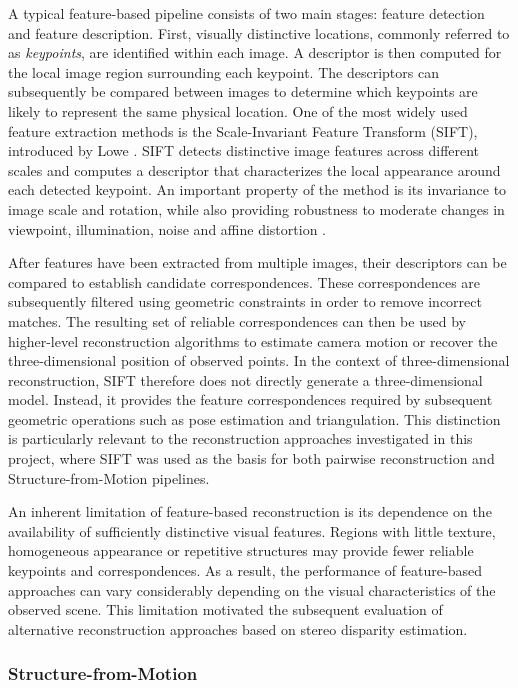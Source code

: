 A typical feature-based pipeline consists of two main stages: feature detection and feature description. First, visually distinctive locations, commonly referred to as \textit{keypoints}, are identified within each image. A descriptor is then computed for the local image region surrounding each keypoint. The descriptors can subsequently be compared between images to determine which keypoints are likely to represent the same physical location. One of the most widely used feature extraction methods is the Scale-Invariant Feature Transform (SIFT), introduced by Lowe \cite{lowe_distinctive_2004}. SIFT detects distinctive image features across different scales and computes a descriptor that characterizes the local appearance around each detected keypoint. An important property of the method is its invariance to image scale and rotation, while also providing robustness to moderate changes in viewpoint, illumination, noise and affine distortion \cite{lowe_distinctive_2004}.

After features have been extracted from multiple images, their descriptors can be compared to establish candidate correspondences. These correspondences are subsequently filtered using geometric constraints in order to remove incorrect matches. The resulting set of reliable correspondences can then be used by higher-level reconstruction algorithms to estimate camera motion or recover the three-dimensional position of observed points. In the context of three-dimensional reconstruction, SIFT therefore does not directly generate a three-dimensional model. Instead, it provides the feature correspondences required by subsequent geometric operations such as pose estimation and triangulation. This distinction is particularly relevant to the reconstruction approaches investigated in this project, where SIFT was used as the basis for both pairwise reconstruction and Structure-from-Motion pipelines.

An inherent limitation of feature-based reconstruction is its dependence on the availability of sufficiently distinctive visual features. Regions with little texture, homogeneous appearance or repetitive structures may provide fewer reliable keypoints and correspondences. As a result, the performance of feature-based approaches can vary considerably depending on the visual characteristics of the observed scene. This limitation motivated the subsequent evaluation of alternative reconstruction approaches based on stereo disparity estimation.

\subsubsection{Structure-from-Motion}

